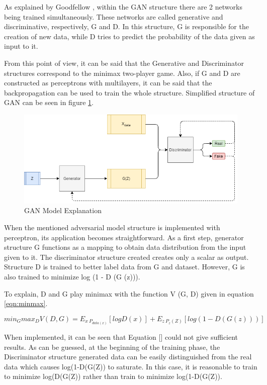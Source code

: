 As explained by Goodfellow \cite{gan}, within the GAN structure there are 2 networks being trained simultaneously. These networks are called generative and discriminative, respectively, G and D. In this structure, G is responsible for the creation of new data, while D tries to predict the probability of the data given as input to it.

From this point of view, it can be said that the Generative and Discriminator structures correspond to the minimax two-player game. Also, if G and D are constructed as perceptrons with multilayers, it can be said that the backpropagation can be used to train the whole structure. Simplified structure of GAN can be seen in figure \ref{fig:ganstruct}.

\begin{figure}[h]
    \centering
    \includegraphics[scale=0.55]{figures/chapter3/GAN.png}
    \caption{GAN Model Explanation}
    \label{fig:ganstruct}
\end{figure}

When the mentioned adversarial model structure is implemented with perceptron, its application becomes straightforward. As a first step, generator structure G functions as a mapping to obtain data distribution from the input given to it. The discriminator structure created creates only a scalar as output. Structure D is trained to better label data from G and dataset. However, G is also trained to minimize log (1 - D (G (z))).

To explain, D and G play minimax with the function V (G, D) given in equation \ref{eqn:minmax}.

\begin{equation}
\label{eqn:minmax}
    min_Gmax_D V(D,G)= E_{x~P_{data(x)}}[logD(x)]+E_{z~P_{z}(Z)}[log(1-D(G(z)))]
\end{equation}

When implemented, it can be seen that Equation [] could not give sufficient results. As can be guessed, at the beginning of the training phase, the Discriminator structure generated data can be easily distinguished from the real data which causes log(1-D(G(Z)) to saturate. In this case, it is reasonable to train to minimize log(D(G(Z)) rather than train to minimize log(1-D(G(Z)).

